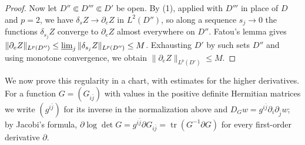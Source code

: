 \begin{proof}
Now let $D''\Subset D'''\Subset D'$ be open. By (1), applied with $D'''$ in place of $D$ and $p=2$, we have $\delta_sZ\to\partial_eZ$ in $L^2(D'')$, so along a sequence $s_j\to0$ the functions $\delta_{s_j}Z$ converge to $\partial_eZ$ almost everywhere on $D''$. Fatou's lemma gives $\|\partial_eZ\|_{L^p(D'')}\leq\varliminf_j\|\delta_{s_j}Z\|_{L^p(D'')}\leq M$. Exhausting $D'$ by such sets $D''$ and using monotone convergence, we obtain $\|\partial_eZ\|_{L^p(D')}\leq M$.
\end{proof}

We now prove this regularity in a chart, with estimates for the higher derivatives. For a function $G=(G_{i\bar j})$ with values in the positive definite Hermitian matrices we write $(g^{i\bar j})$ for its inverse in the normalization above and $D_Gw=g^{i\bar j}\partial_i\partial_{\bar j}w$; by Jacobi's formula, $\partial\log\det G=g^{i\bar j}\partial G_{i\bar j}=\operatorname{tr}(G^{-1}\partial G)$ for every first-order derivative $\partial$.

